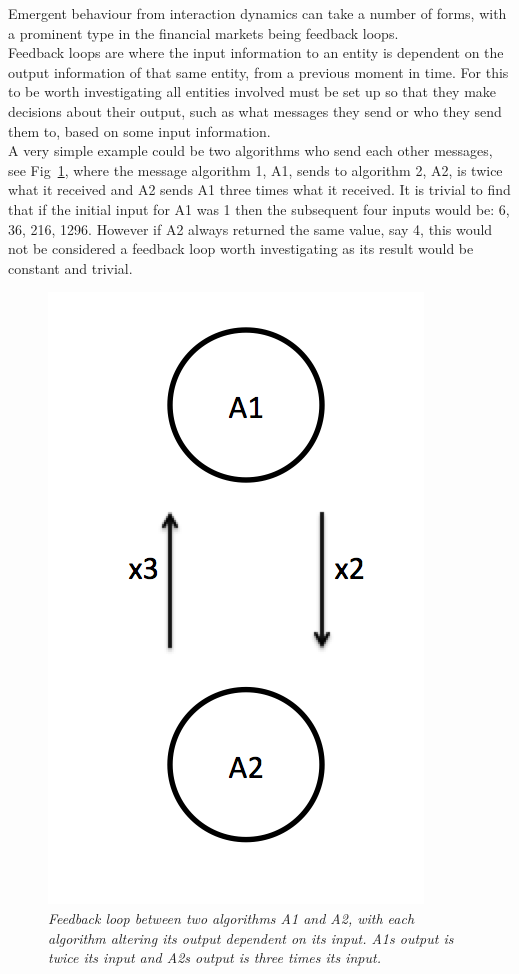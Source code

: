 \documentclass{article}
\begin{document}
Emergent behaviour from interaction dynamics can take a number of forms, with a prominent type in the financial markets being feedback loops.\\
Feedback loops are where the input information to an entity is dependent on the output information of that same entity, from a previous moment in time. For this to be worth investigating all entities involved must be set up so that they make decisions about their output, such as what messages they send or who they send them to, based on some input information.\\
A very simple example could be two algorithms who send each other messages, see Fig~\ref{fig:examplesimpletwofeedback}, where the message algorithm 1, A1, sends to algorithm 2, A2, is twice what it received and A2 sends A1 three times what it received. It is trivial to find that if the initial input for A1 was 1 then the subsequent four inputs would be: 6, 36, 216, 1296. However if A2 always returned the same value, say 4, this would not be considered a feedback loop worth investigating as its result would be constant and trivial.         

\begin{figure}[H]
	\centering
	\includegraphics[scale=0.5]{simpletwofbex}
	\caption{\it Feedback loop between two algorithms A1 and A2, with each algorithm altering its output dependent on its input. A1s output is twice its input and A2s output is three times its input.}
	\label{fig:examplesimpletwofeedback}
\end{figure} 
\end{document}

